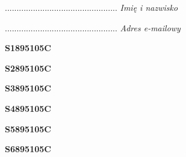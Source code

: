 \begin{turn}{90}\begin{minipage}{\linewidth} \vspace{20mm} ................................................  \textit{Imię i nazwisko}\end{minipage}\end{turn}

\begin{turn}{90}\begin{minipage}{\linewidth} \vspace{20mm} ................................................  \textit{Adres e-mailowy}\end{minipage}\end{turn}

\begin{turn}{90}\huge \begin{minipage}{\linewidth} \vspace{10mm}\textbf{S1895105C}\end{minipage}\end{turn}

\begin{turn}{90}\huge \begin{minipage}{\linewidth} \vspace{10mm}\textbf{S2895105C}\end{minipage}\end{turn}

\begin{turn}{90}\huge \begin{minipage}{\linewidth} \vspace{10mm}\textbf{S3895105C}\end{minipage}\end{turn}

\begin{turn}{90}\huge \begin{minipage}{\linewidth} \vspace{10mm}\textbf{S4895105C}\end{minipage}\end{turn}

\begin{turn}{90}\huge \begin{minipage}{\linewidth} \vspace{10mm}\textbf{S5895105C}\end{minipage}\end{turn}

\begin{turn}{90}\huge \begin{minipage}{\linewidth} \vspace{10mm}\textbf{S6895105C}\end{minipage}\end{turn}

